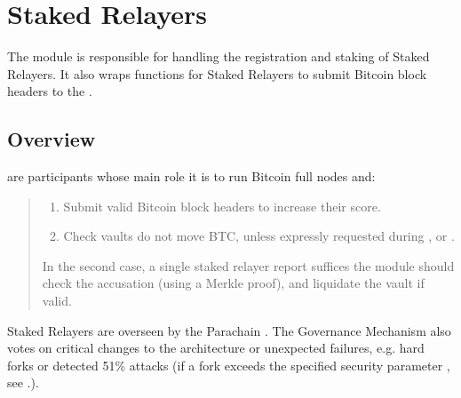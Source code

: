 \documentclass[a4paper,10pt,english]{sphinxmanual}
\begin{document}
\chapter{Staked Relayers}
\label{\detokenize{spec/staked-relayers:staked-relayers}}\label{\detokenize{spec/staked-relayers:id1}}\label{\detokenize{spec/staked-relayers::doc}}
The {\hyperref[\detokenize{spec/staked-relayers:staked-relayers}]{}} module is responsible for handling the registration and staking of Staked Relayers.
It also wraps functions for Staked Relayers to submit Bitcoin block headers to the {\hyperref[\detokenize{spec/btc-relay:btc-relay}]{}}.


\section{Overview}
\label{\detokenize{spec/staked-relayers:overview}}
 are participants whose main role it is to run Bitcoin full nodes and:
\begin{quote}
\begin{enumerate}
%
\item {} 
Submit valid Bitcoin block headers to increase their {\hyperref[\detokenize{spec/sla:sla}]{}} score.

\item {} 
Check vaults do not move BTC, unless expressly requested during {\hyperref[\detokenize{spec/redeem:redeem-protocol}]{}}, {\hyperref[\detokenize{spec/replace:replace-protocol}]{}} or {\hyperref[\detokenize{spec/refund:refund-protocol}]{}}.

\end{enumerate}

In the second case, a single staked relayer report suffices \sphinxhyphen{} the module should check the accusation (using a Merkle proof), and liquidate the vault if valid.
\end{quote}

Staked Relayers are overseen by the Parachain .
The Governance Mechanism also votes on critical changes to the architecture or unexpected failures, e.g. hard forks or detected 51\% attacks (if a fork exceeds the specified security parameter , see .).
\end{document}

